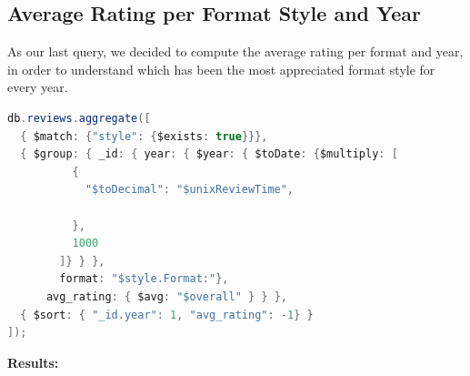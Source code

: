 \subsection{Average Rating per Format Style and Year}
As our last query, we decided to compute the average rating per format and year, in order to understand which has been the most appreciated format style for every year. \\
\begin{lstlisting}[language=Java]
db.reviews.aggregate([
  { $match: {"style": {$exists: true}}},
  { $group: { _id: { year: { $year: { $toDate: {$multiply: [
          {
            "$toDecimal": "$unixReviewTime",
            
          },
          1000
        ]} } }, 
        format: "$style.Format:"}, 
      avg_rating: { $avg: "$overall" } } },
  { $sort: { "_id.year": 1, "avg_rating": -1} }
]);
\end{lstlisting}
\textbf{Results:}
